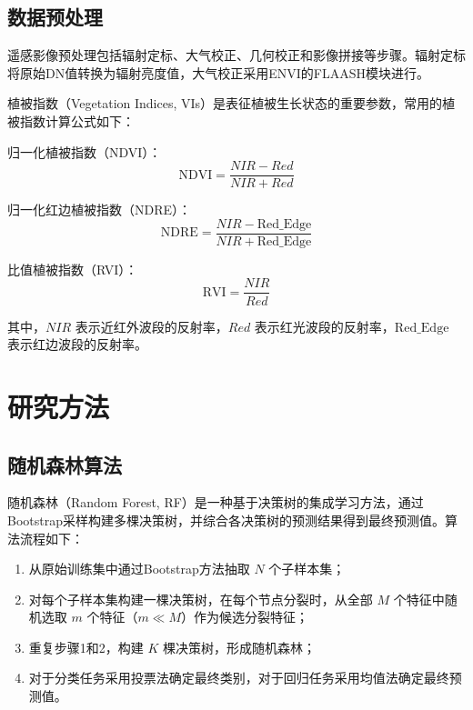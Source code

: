 \subsection{数据预处理}
\label{subsec:preprocess}

遥感影像预处理包括辐射定标、大气校正、几何校正和影像拼接等步骤。辐射定标将原始DN值转换为辐射亮度值，大气校正采用ENVI的FLAASH模块进行。

植被指数（Vegetation Indices, VIs）是表征植被生长状态的重要参数，常用的植被指数计算公式如下：

归一化植被指数（NDVI）：
\begin{equation}
  \label{eq:ndvi}
  \text{NDVI} = \frac{NIR - Red}{NIR + Red}
\end{equation}

归一化红边植被指数（NDRE）：
\begin{equation}
  \label{eq:ndre}
  \text{NDRE} = \frac{NIR - \text{Red\_Edge}}{NIR + \text{Red\_Edge}}
\end{equation}

比值植被指数（RVI）：
\begin{equation}
  \label{eq:rvi}
  \text{RVI} = \frac{NIR}{Red}
\end{equation}

其中，$NIR$ 表示近红外波段的反射率，$Red$ 表示红光波段的反射率，$\text{Red\_Edge}$ 表示红边波段的反射率。

\section{研究方法}
\label{sec:method}

\subsection{随机森林算法}
\label{subsec:rf}

随机森林（Random Forest, RF）是一种基于决策树的集成学习方法，通过Bootstrap采样构建多棵决策树，并综合各决策树的预测结果得到最终预测值。算法流程如下：

\begin{enumerate}[itemsep=0pt,parsep=0pt]
  \item 从原始训练集中通过Bootstrap方法抽取 $N$ 个子样本集；
  \item 对每个子样本集构建一棵决策树，在每个节点分裂时，从全部 $M$ 个特征中随机选取 $m$ 个特征（$m \ll M$）作为候选分裂特征；
  \item 重复步骤1和2，构建 $K$ 棵决策树，形成随机森林；
  \item 对于分类任务采用投票法确定最终类别，对于回归任务采用均值法确定最终预测值。
\end{enumerate}

